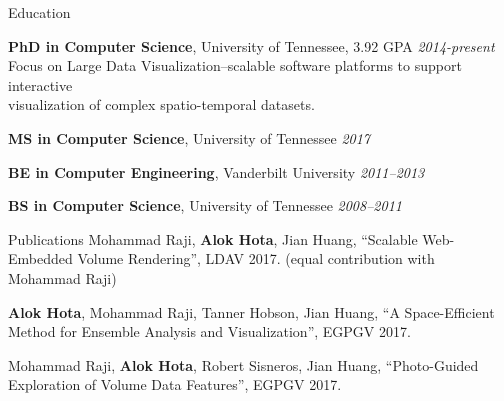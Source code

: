 \documentclass{resume} %
\begin{document}

\begin{rSection}{Education}

{{\bf PhD in Computer Science}, University of Tennessee, 3.92 GPA} \hfill {\em 2014-present} \\ 
Focus on Large Data Visualization--scalable software platforms to support interactive \\
visualization of complex spatio-temporal datasets.

{{\bf MS in Computer Science}, University of Tennessee} \hfill {\em 2017}

{{\bf BE in Computer Engineering}, Vanderbilt University} \hfill {\em 2011--2013}

{{\bf BS in Computer Science}, University of Tennessee} \hfill {\em 2008--2011}

\end{rSection}


\begin{rSection}{Publications}
    Mohammad Raji, \textbf{Alok Hota}, Jian Huang, ``Scalable Web-Embedded Volume Rendering'', LDAV 2017. (equal contribution with Mohammad Raji)
    
    \textbf{Alok Hota}, Mohammad Raji, Tanner Hobson, Jian Huang, ``A Space-Efficient Method for Ensemble Analysis and Visualization'', EGPGV 2017.
    
    Mohammad Raji, \textbf{Alok Hota}, Robert Sisneros, Jian Huang, ``Photo-Guided Exploration of Volume Data Features'', EGPGV 2017.
\end{rSection}

\end{document}
